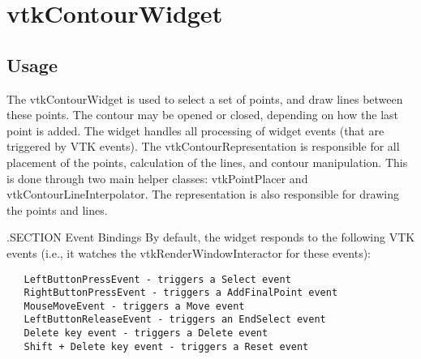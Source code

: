 \section{vtkContourWidget}

\subsection{Usage}

 The vtkContourWidget is used to select a set of points, and draw lines
 between these points. The contour may be opened or closed, depending on
 how the last point is added. The widget handles all processing of widget
 events (that are triggered by VTK events). The vtkContourRepresentation is
 responsible for all placement of the points, calculation of the lines, and
 contour manipulation. This is done through two main helper classes:
 vtkPointPlacer and vtkContourLineInterpolator. The representation is also
 responsible for drawing the points and lines.

 .SECTION Event Bindings
 By default, the widget responds to the following VTK events (i.e., it
 watches the vtkRenderWindowInteractor for these events):
 \begin{verbatim}
   LeftButtonPressEvent - triggers a Select event
   RightButtonPressEvent - triggers a AddFinalPoint event
   MouseMoveEvent - triggers a Move event
   LeftButtonReleaseEvent - triggers an EndSelect event
   Delete key event - triggers a Delete event
   Shift + Delete key event - triggers a Reset event
 \end{verbatim}


